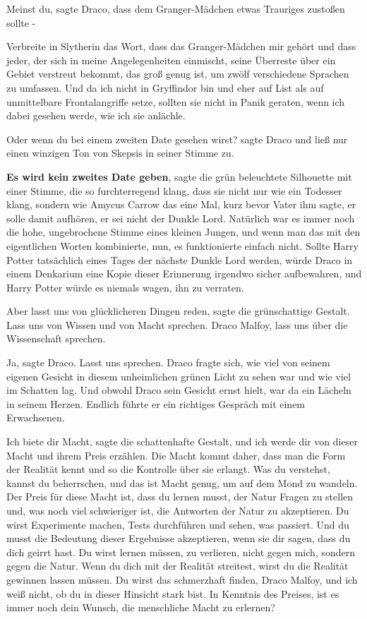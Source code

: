 \glqq{}Meinst du\grqq{}, sagte Draco, \glqq{}dass dem Granger-Mädchen etwas
Trauriges zustoßen sollte -\grqq{}

\glqq{}Verbreite in Slytherin das Wort, dass das Granger-Mädchen mir gehört und
dass jeder, der sich in meine Angelegenheiten einmischt, seine Überreste über
ein Gebiet verstreut bekommt, das groß genug ist, um zwölf verschiedene Sprachen
zu umfassen. Und da ich nicht in Gryffindor bin und eher auf List als auf
unmittelbare Frontalangriffe setze, sollten sie nicht in Panik geraten, wenn ich
dabei gesehen werde, wie ich sie anlächle.\grqq{}

\glqq{}Oder wenn du bei einem zweiten Date gesehen wirst?\grqq{} sagte Draco und
ließ nur einen winzigen Ton von Skepsis in seiner Stimme zu.

\textbf{\glqq{}Es wird kein zweites Date geben\grqq{}}, sagte die grün
beleuchtete Silhouette mit einer Stimme, die so furchterregend klang, dass sie
nicht nur wie ein Todesser klang, sondern wie Amycus Carrow das eine Mal, kurz
bevor Vater ihm sagte, er solle damit aufhören, er sei nicht der Dunkle Lord.
Natürlich war es immer noch die hohe, ungebrochene Stimme eines kleinen Jungen,
und wenn man das mit den eigentlichen Worten kombinierte, nun, es funktionierte
einfach nicht. Sollte Harry Potter tatsächlich eines Tages der nächste Dunkle
Lord werden, würde Draco in einem Denkarium eine Kopie dieser Erinnerung
irgendwo sicher aufbewahren, und Harry Potter würde es niemals wagen, ihn zu
verraten.

\glqq{}Aber lasst uns von glücklicheren Dingen reden\grqq{}, sagte die
grünschattige Gestalt. \glqq{}Lass uns von Wissen und von Macht sprechen. Draco
Malfoy, lass uns über die Wissenschaft sprechen.\grqq{}

\glqq{}Ja\grqq{}, sagte Draco. \glqq{}Lasst uns sprechen.\grqq{} Draco fragte
sich, wie viel von seinem eigenen Gesicht in diesem unheimlichen grünen Licht zu
sehen war und wie viel im Schatten lag. Und obwohl Draco sein Gesicht ernst
hielt, war da ein Lächeln in seinem Herzen. Endlich führte er ein richtiges
Gespräch mit einem Erwachsenen.

\glqq{}Ich biete dir Macht\grqq{}, sagte die schattenhafte Gestalt, \glqq{}und ich
werde dir von dieser Macht und ihrem Preis erzählen. Die Macht kommt daher, dass
man die Form der Realität kennt und so die Kontrolle über sie erlangt. Was du
verstehst, kannst du beherrschen, und das ist Macht genug, um auf dem Mond zu
wandeln. Der Preis für diese Macht ist, dass du lernen musst, der Natur Fragen
zu stellen und, was noch viel schwieriger ist, die Antworten der Natur zu
akzeptieren. Du wirst Experimente machen, Tests durchführen und sehen, was
passiert. Und du musst die Bedeutung dieser Ergebnisse akzeptieren, wenn sie dir
sagen, dass du dich geirrt hast. Du wirst lernen müssen, zu verlieren, nicht
gegen mich, sondern gegen die Natur. Wenn du dich mit der Realität streitest,
wirst du die Realität gewinnen lassen müssen. Du wirst das schmerzhaft finden,
Draco Malfoy, und ich weiß nicht, ob du in dieser Hinsicht stark bist. In
Kenntnis des Preises, ist es immer noch dein Wunsch, die menschliche Macht zu
erlernen?\grqq{}

